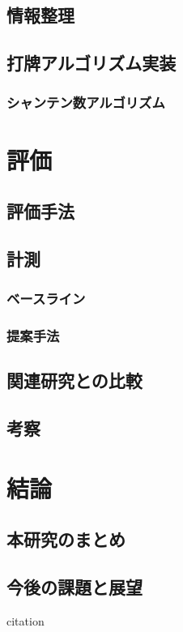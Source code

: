 \section{情報整理}
\section{打牌アルゴリズム実装}
\subsection{シャンテン数アルゴリズム}

\chapter{評価}
\label{chap:evaluation}
\section{評価手法}
\section{計測}
\subsection{ベースライン}
\subsection{提案手法}
\section{関連研究との比較}
\section{考察}

\chapter{結論}
\label{chap:conclusion}
\section{本研究のまとめ}
\section{今後の課題と展望}

citation\cite{hoge09}
